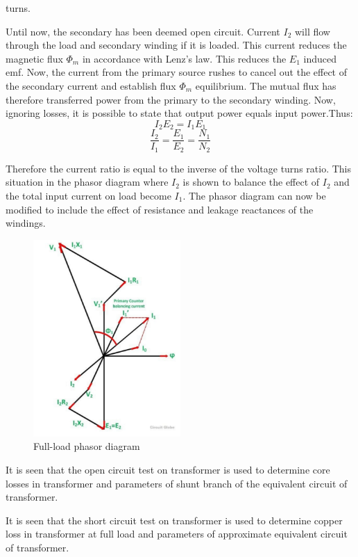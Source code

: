 \documentclass{article}
\begin{document}
turns.\par
Until now, the secondary has been deemed open circuit. Current $I_{2}$ will flow through the load and secondary winding if it is loaded. This current reduces the magnetic flux $\Phi_{m}$ in accordance with Lenz's law. This reduces the $E_{1}$ induced emf. Now, the current from the primary source rushes to cancel out the effect of the secondary current and establish flux $\Phi_{m}$ equilibrium. The mutual flux has therefore transferred power from the primary to the secondary winding. Now, ignoring losses, it is possible to state that output power equals input power.Thus:
\begin{equation}
    I_{2}E_{2}=I_{1}E_{1}
\end{equation}
\begin{equation}
    \frac{I_{2}}{I_{1}}=\frac{E_{1}}{E_{2}}=\frac{N_{1}}{N_{2}}
\end{equation}

Therefore the current ratio is equal to the inverse of the voltage turns ratio. This situation in 
the phasor diagram where $I_{2}$ is shown to balance the effect of $I_{2}$ and the total input current on load become $I_{1}$. The phasor diagram can now be modified to include the effect of resistance 
and leakage reactances of the windings.\par
\begin{figure}[h!]
    \centering
    \includegraphics[width=0.5\textwidth]{img2.png}
    \caption{Full-load phasor diagram}
\end{figure}
It is seen that the open circuit test on transformer is used to determine core losses in transformer and parameters of shunt branch of the equivalent circuit
of transformer.\par
It is seen that the short circuit test on transformer is used to determine
copper loss in transformer at full load and parameters of approximate equivalent
circuit of transformer.
\end{document}
